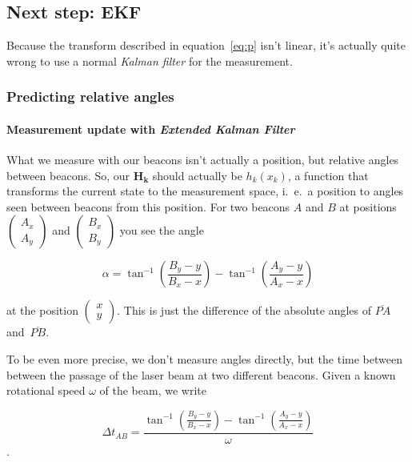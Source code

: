 \documentclass[a4paper, 12pt]{paper}
\begin{document}
\subsection{Next step: EKF}

Because the transform described in equation~\ref{eq:p} isn't linear, it's
actually quite wrong to use a normal \emph{Kalman filter} for the measurement.

\subsubsection{Predicting relative angles}

\paragraph{Measurement update with \emph{Extended Kalman Filter}}

What we measure with our beacons isn't actually a position, but relative angles
between beacons. So, our $\mathbf{H_k}$ should actually be $h_k(x_k)$, a
function that transforms the current state to the measurement space, i.\ e.\ a
position to angles seen between beacons from this position.
For two beacons $A$ and $B$ at positions
$\left(\begin{array}{c} A_x \\ A_y \end{array} \right)$ and 
$\left(\begin{array}{c} B_x \\ B_y \end{array} \right)$ you see the angle

\begin{equation}
    \alpha = \tan^{-1}\left(\frac{B_y-y}{B_x-x}\right)
             - \tan^{-1}\left(\frac{A_y-y}{A_x-x}\right)
    \label{eq:pos_to_angle}
\end{equation}

at the position $\left(\begin{array}{c} x \\ y \end{array} \right)$. This is
just the difference of the absolute angles of $\overline{PA}$
and~$\overline{PB}$.

To be even more precise, we don't measure angles directly, but the time between
between the passage of the laser beam at two different beacons. Given a known
rotational speed $\omega$ of the beam, we write

\begin{equation}
    \Delta t_{AB} = \frac{\tan^{-1}\left(\frac{B_y-y}{B_x-x}\right)
        - \tan^{-1}\left(\frac{A_y-y}{A_x-x}\right)}{\omega}
    \label{eq:pos_to_delta_t}
\end{equation}.
\end{document}
